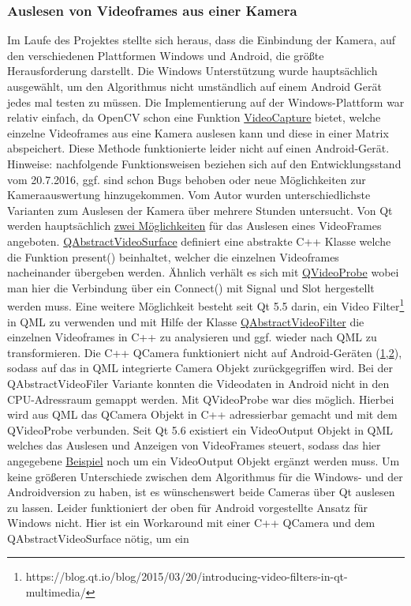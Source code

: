 \subsubsection{Auslesen von Videoframes aus einer Kamera}
Im Laufe des Projektes stellte sich heraus, dass die Einbindung der Kamera, auf den verschiedenen Plattformen Windows und Android, die größte Herausforderung darstellt. Die Windows Unterstützung wurde hauptsächlich ausgewählt, um den Algorithmus nicht umständlich auf einem Android Gerät jedes mal testen zu müssen. Die Implementierung auf der Windows-Plattform war relativ einfach, da OpenCV schon eine Funktion \href{http://docs.opencv.org/3.1.0/d8/dfe/classcv_1_1VideoCapture.html}{VideoCapture} bietet, welche einzelne Videoframes aus eine Kamera auslesen kann und diese in einer Matrix abspeichert. Diese Methode funktionierte leider nicht auf einen Android-Gerät. Hinweise: nachfolgende Funktionsweisen beziehen sich auf den Entwicklungsstand vom 20.7.2016, ggf. sind schon Bugs behoben oder neue Möglichkeiten zur Kameraauswertung hinzugekommen. Vom Autor wurden unterschiedlichste Varianten zum Auslesen der Kamera über mehrere Stunden untersucht. Von Qt werden hauptsächlich \href{http://doc.qt.io/qt-5/videooverview.html}{zwei Möglichkeiten} für das Auslesen eines VideoFrames angeboten. \href{http://doc.qt.io/qt-5/qabstractvideosurface.html}{QAbstractVideoSurface} definiert eine abstrakte C++ Klasse welche die Funktion present() beinhaltet, welcher die einzelnen Videoframes nacheinander übergeben werden. Ähnlich verhält es sich mit \href{http://doc.qt.io/qt-5/qvideoprobe.html}{QVideoProbe} wobei man hier die Verbindung über ein Connect() mit Signal und Slot hergestellt werden muss. Eine weitere Möglichkeit besteht seit Qt 5.5 darin, ein Video Filter\footnote{\label{video_filter}https://blog.qt.io/blog/2015/03/20/introducing-video-filters-in-qt-multimedia/} in QML zu verwenden und mit Hilfe der Klasse \href{http://doc.qt.io/qt-5/qabstractvideofilter.html}{QAbstractVideoFilter} die einzelnen Videoframes in C++ zu analysieren und ggf. wieder nach QML zu transformieren. Die C++ QCamera funktioniert nicht auf Android-Geräten (\href{https://bugreports.qt.io/browse/QTBUG-41194}{1},\href{http://stackoverflow.com/questions/28041741/qt-qml-camera-to-c-qimage-on-android}{2}), sodass auf das in QML integrierte Camera Objekt zurückgegriffen wird. Bei der QAbstractVideoFiler Variante konnten die Videodaten in Android nicht in den CPU-Adressraum gemappt werden. Mit QVideoProbe war dies möglich. Hierbei wird aus QML das QCamera Objekt in C++ adressierbar gemacht und mit dem QVideoProbe verbunden. Seit Qt 5.6 existiert ein VideoOutput Objekt in QML welches das Auslesen und Anzeigen von VideoFrames steuert, sodass das hier angegebene \href{http://stackoverflow.com/questions/28041741/qt-qml-camera-to-c-qimage-on-android/33238150\#33238150}{Beispiel} noch um ein VideoOutput Objekt ergänzt werden muss. Um keine größeren Unterschiede zwischen dem Algorithmus für die Windows- und der Androidversion zu haben, ist es wünschenswert beide Cameras über Qt auslesen zu lassen. Leider funktioniert der oben für Android vorgestellte Ansatz für Windows nicht. Hier ist ein Workaround mit einer C++ QCamera und dem QAbstractVideoSurface nötig, um ein 